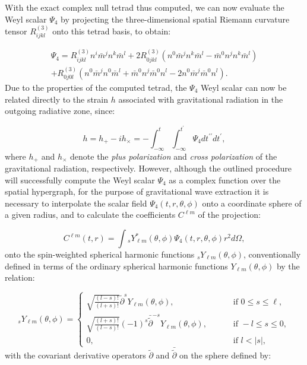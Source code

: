 \documentclass{article}
\begin{document}
With the exact complex null tetrad thus computed, we can now evaluate the Weyl scalar ${\Psi_4}$ by projecting the three-dimensional spatial Riemann curvature tensor ${R_{i j k l}^{\left( 3 \right)}}$ onto this tetrad basis, to obtain:

\begin{multline}
\Psi_4 = R_{i j k l}^{\left( 3 \right)} n^i \bar{m}^j n^k \bar{m}^l + 2 R_{0 j k l}^{\left( 3 \right)} \left( n^0 \bar{m}^j n^k \bar{m}^l - \bar{m}^0 n^j n^k \bar{m}^l \right)\\
+ R_{0 j 0 l}^{\left( 3 \right)} \left( n^0 \bar{m}^j n^0 \bar{m}^l + \bar{m}^0 n^j \bar{m}^0 n^l - 2 n^0 \bar{m}^j \bar{m}^0 n^l \right).
\end{multline}
Due to the properties of the computed tetrad, the ${\Psi_4}$ Weyl scalar can now be related directly to the strain $h$ associated with gravitational radiation in the outgoing radiative zone, since:

\begin{equation}
h = h_{+} - i h_{\times} = - \int_{- \infty}^{t} \int_{- \infty}^{t^{\prime}} \Psi_4 dt^{\prime \prime} dt^{\prime},
\end{equation}
where ${h_{+}}$ and ${h_{\times}}$ denote the \textit{plus polarization} and \textit{cross polarization} of the gravitational radiation, respectively. However, although the outlined procedure will successfully compute the Weyl scalar ${\Psi_4}$ as a complex function over the spatial hypergraph, for the purpose of gravitational wave extraction it is necessary to interpolate the scalar field ${\Psi_4 \left( t, r, \theta, \phi \right)}$ onto a coordinate sphere of a given radius, and to calculate the coefficients ${C^{\ell m}}$ of the projection:

\begin{equation}
C^{\ell m} \left( t, r \right) = \int {}_s Y_{\ell m}^{*} \left( \theta, \phi \right) \Psi_4 \left( t, r, \theta, \phi \right) r^2 d \Omega,
\end{equation}
onto the spin-weighted spherical harmonic functions ${{}_s Y_{\ell m} \left( \theta, \phi \right)}$, conventionally defined in terms of the ordinary spherical harmonic functions ${Y_{\ell m} \left(\theta, \phi \right)}$ by the relation\cite{dray}:

\begin{equation}
{}_s Y_{\ell m} \left( \theta, \phi \right) = \begin{cases}
\sqrt{\frac{\left( l - s \right)!}{\left( l + s \right)!}} \tilde{\partial}^s Y_{\ell m} \left( \theta, \phi \right), \qquad &\text{ if  } 0 \leq s \leq \ell,\\
\sqrt{\frac{\left( l + s \right)!}{\left( l - s \right)!}} \left( -1 \right)^s \bar{\tilde{\partial}}^{-s} Y_{\ell m} \left( \theta, \phi \right), \qquad &\text{ if } -l \leq s \leq 0,\\
0, \qquad &\text{ if } l < \left\lvert s \right\rvert,
\end{cases}
\end{equation}
with the covariant derivative operators ${\tilde{\partial}}$ and ${\bar{\tilde{\partial}}}$ on the sphere defined by:
\end{document}
